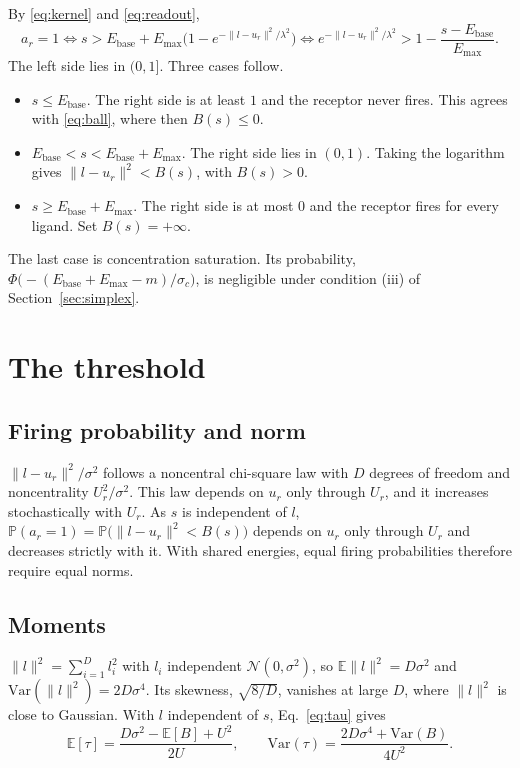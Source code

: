 \documentclass[11pt,a4paper]{article}
\newcommand{\EE}{\mathbb{E}}
\newcommand{\PP}{\mathbb{P}}
\newcommand{\Var}{\mathrm{Var}}
\newcommand{\Ebase}{E_{\mathrm{base}}}
\newcommand{\Emax}{E_{\mathrm{max}}}
\begin{document}
By \eqref{eq:kernel} and \eqref{eq:readout},
\begin{equation*}
  a_r=1
  \iff s>\Ebase+\Emax\Big(1-e^{-\|l-u_r\|^2/\lambda^2}\Big)
  \iff e^{-\|l-u_r\|^2/\lambda^2}>1-\frac{s-\Ebase}{\Emax}.
\end{equation*}
The left side lies in $(0,1]$. Three cases follow.
\begin{itemize}
\item $s\le\Ebase$. The right side is at least $1$ and the receptor never fires. This
  agrees with \eqref{eq:ball}, where then $B(s)\le0$.
\item $\Ebase<s<\Ebase+\Emax$. The right side lies in $(0,1)$. Taking the logarithm gives
  $\|l-u_r\|^2<B(s)$, with $B(s)>0$.
\item $s\ge\Ebase+\Emax$. The right side is at most $0$ and the receptor fires for every
  ligand. Set $B(s)=+\infty$.
\end{itemize}
The last case is concentration saturation. Its probability,
$\Phi\big(-(\Ebase+\Emax-m)/\sigma_c\big)$, is negligible under condition (iii) of
Section~\ref{sec:simplex}.

\section{The threshold}
\label{app:moments}

\subsection{Firing probability and norm}
\label{app:norm}

$\|l-u_r\|^2/\sigma^2$ follows a noncentral chi-square law with $D$ degrees of freedom and
noncentrality $U_r^2/\sigma^2$. This law depends on $u_r$ only through $U_r$, and it
increases stochastically with $U_r$. As $s$ is independent of $l$,
$\PP(a_r=1)=\PP\big(\|l-u_r\|^2<B(s)\big)$ depends on $u_r$ only through $U_r$ and
decreases strictly with it. With shared energies, equal firing probabilities therefore
require equal norms.

\subsection{Moments}
\label{app:mom}

$\|l\|^2=\sum_{i=1}^D l_i^2$ with $l_i$ independent $\mathcal N(0,\sigma^2)$, so
$\EE\|l\|^2=D\sigma^2$ and $\Var(\|l\|^2)=2D\sigma^4$. Its skewness, $\sqrt{8/D}$, vanishes
at large $D$, where $\|l\|^2$ is close to Gaussian. With $l$ independent of $s$,
Eq.~\eqref{eq:tau} gives
\begin{equation*}
  \EE[\tau]=\frac{D\sigma^2-\EE[B]+U^2}{2U},
  \qquad
  \Var(\tau)=\frac{2D\sigma^4+\Var(B)}{4U^2}.
\end{equation*}
\end{document}
